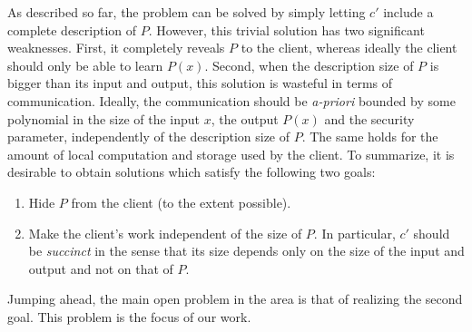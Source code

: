 \documentclass[11pt]{article}
\begin{document}
As described so far, the problem can be solved by simply letting
$c'$ include a complete description of $P$. However, this trivial
solution has two significant weaknesses. First, it completely
reveals $P$ to the client, whereas ideally the client should only
be able to learn $P(x)$. Second, when the description size of $P$
is bigger than its input and output, this solution is wasteful in
terms of communication. Ideally, the communication should be {\em
a-priori} bounded by some polynomial in the size of the input $x$,
the output $P(x)$ and the security parameter, independently of the
description size of $P$.  The same holds for the amount of local
computation and storage used by the client. To summarize, it is
desirable to obtain solutions which satisfy the following two
goals:
\begin{enumerate}
\item Hide $P$ from the client (to the extent possible).

\item Make the client's work independent of the size of $P$. In
particular, $c'$ should be {\em succinct} in the sense that its
size depends only on the size of the input and output and not
on that of $P$.
\end{enumerate}
Jumping ahead, the main open problem in the area is that of
realizing the second goal. This problem is the focus of our
work.

%
\end{document}
